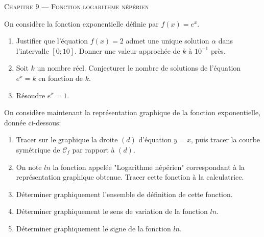 \documentclass[a4paper]{article}
\begin{document}
\begin{center}
  {\scshape\LARGE Chapitre 9 --- Fonction logarithme népérien\par}
\end{center}

\begin{activite}{}{} 
On considère la fonction exponentielle définie par $f(x)=e^x$.

\begin{enumerate}
  \item Justifier que l'équation $f(x)=2$ admet une unique solution $\alpha$ dans l'intervalle $[0;10]$. Donner une valeur approchée de $k$ à $10^{-1}$ près.
  \item Soit $k$ un nombre réel. Conjecturer le nombre de solutions de l'équation $e^x=k$ en fonction de $k$.
  \item Résoudre $e^x=1$.
\end{enumerate}
\end{activite}

\begin{activite}{}{}
On considère maintenant la représentation graphique de la fonction exponentielle, donnée ci-dessous:
\begin{center}
\end{center}

\begin{enumerate}
  \item Tracer sur le graphique la droite $(d)$ d'équation $y=x$, puis tracer la courbe symétrique de $\mathcal{C}_f$ par rapport à $(d)$.
  \item On note $ln$ la fonction appelée "Logarithme népérien" correspondant à la représentation graphique obtenue. Tracer cette fonction à la calculatrice.
  \item Déterminer graphiquement l'ensemble de définition de cette fonction.
  \vspace{2cm}
  \item Déterminer graphiquement le sens de variation de la fonction $ln$.
  \vspace{2.5cm}
  \item Déterminer graphiquement le signe de la fonction $ln$.
  \vspace{2.5cm}
\end{enumerate}
\end{activite}
\end{document}

